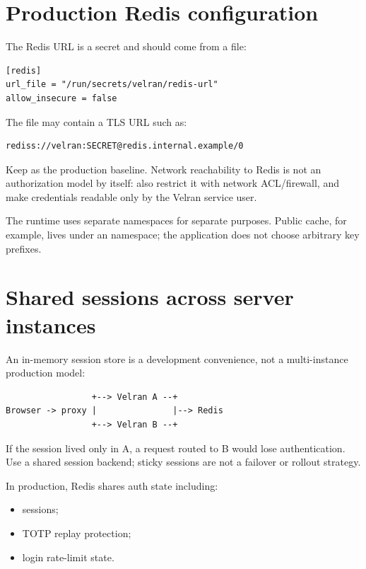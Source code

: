 \section{Production Redis configuration}

The Redis URL is a secret and should come from a file:

\begin{lstlisting}
[redis]
url_file = "/run/secrets/velran/redis-url"
allow_insecure = false
\end{lstlisting}

The file may contain a TLS URL such as:

\begin{lstlisting}
rediss://velran:SECRET@redis.internal.example/0
\end{lstlisting}

Keep  as the production baseline. Network reachability to Redis is not an authorization model by itself: also restrict it with network ACL/firewall, and make credentials readable only by the Velran service user.

The runtime uses separate namespaces for separate purposes. Public cache, for example, lives under an  namespace; the application does not choose arbitrary key prefixes.

\section{Shared sessions across server instances}

An in-memory session store is a development convenience, not a multi-instance production model:

\begin{lstlisting}
                 +--> Velran A --+
Browser -> proxy |               |--> Redis
                 +--> Velran B --+
\end{lstlisting}

If the session lived only in A, a request routed to B would lose authentication. Use a shared session backend; sticky sessions are not a failover or rollout strategy.

In production, Redis shares auth state including:

\begin{itemize}
  \item sessions;
  \item TOTP replay protection;
  \item login rate-limit state.
\end{itemize}

